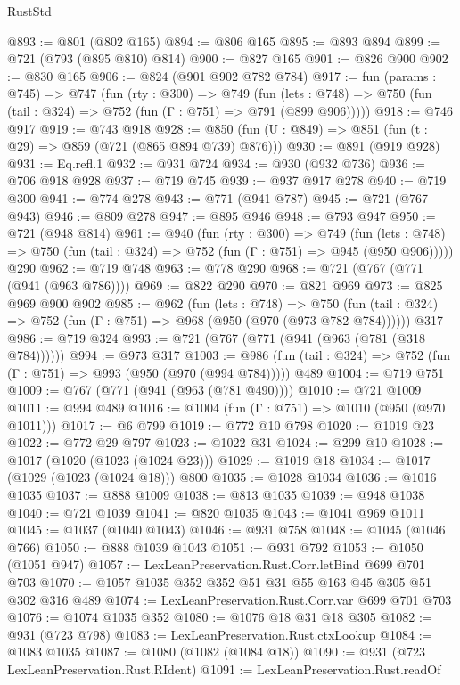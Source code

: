 \begin{lexlean}{RustStd}
\begin{coremodule}
{\begin{coremodule}
{{{{{{{{{{@893 := @801 (@802 @165)
@894 := @806 @165
@895 := @893 @894
@899 := @721 (@793 (@895 @810) @814)
@900 := @827 @165
@901 := @826 @900
@902 := @830 @165
@906 := @824 (@901 @902 @782 @784)
@917 := fun (params : @745) =>
  @747
    (fun (rty : @300) =>
    @749
      (fun (lets : @748) => @750 (fun (tail : @324) => @752 (fun (Γ : @751) => @791 (@899 @906)))))
@918 := @746 @917
@919 := @743 @918
@928 := @850 (fun (U : @849) => @851 (fun (t : @29) => @859 (@721 (@865 @894 @739) @876)))
@930 := @891 (@919 @928)
@931 := Eq.refl.{1}
@932 := @931 @724
@934 := @930 (@932 @736)
@936 := @706 @918 @928
@937 := @719 @745
@939 := @937 @917 @278
@940 := @719 @300
@941 := @774 @278
@943 := @771 (@941 @787)
@945 := @721 (@767 @943)
@946 := @809 @278
@947 := @895 @946
@948 := @793 @947
@950 := @721 (@948 @814)
@961 := @940
    (fun (rty : @300) =>
    @749
      (fun (lets : @748) => @750 (fun (tail : @324) => @752 (fun (Γ : @751) => @945 (@950 @906)))))
    @290
@962 := @719 @748
@963 := @778 @290
@968 := @721 (@767 (@771 (@941 (@963 @786))))
@969 := @822 @290
@970 := @821 @969
@973 := @825 @969 @900 @902
@985 := @962
    (fun (lets : @748) =>
    @750 (fun (tail : @324) => @752 (fun (Γ : @751) => @968 (@950 (@970 (@973 @782 @784))))))
    @317
@986 := @719 @324
@993 := @721 (@767 (@771 (@941 (@963 (@781 (@318 @784))))))
@994 := @973 @317
@1003 := @986 (fun (tail : @324) => @752 (fun (Γ : @751) => @993 (@950 (@970 (@994 @784))))) @489
@1004 := @719 @751
@1009 := @767 (@771 (@941 (@963 (@781 @490))))
@1010 := @721 @1009
@1011 := @994 @489
@1016 := @1004 (fun (Γ : @751) => @1010 (@950 (@970 @1011)))
@1017 := @6 @799
@1019 := @772 @10 @798
@1020 := @1019 @23
@1022 := @772 @29 @797
@1023 := @1022 @31
@1024 := @299 @10
@1028 := @1017 (@1020 (@1023 (@1024 @23)))
@1029 := @1019 @18
@1034 := @1017 (@1029 (@1023 (@1024 @18))) @800
@1035 := @1028 @1034
@1036 := @1016 @1035
@1037 := @888 @1009
@1038 := @813 @1035
@1039 := @948 @1038
@1040 := @721 @1039
@1041 := @820 @1035
@1043 := @1041 @969 @1011
@1045 := @1037 (@1040 @1043)
@1046 := @931 @758
@1048 := @1045 (@1046 @766)
@1050 := @888 @1039 @1043
@1051 := @931 @792
@1053 := @1050 (@1051 @947)
@1057 := LexLeanPreservation.Rust.Corr.letBind @699 @701 @703
@1070 := @1057 @1035 @352 @352 @51 @31 @55 @163 @45 @305 @51 @302 @316 @489
@1074 := LexLeanPreservation.Rust.Corr.var @699 @701 @703
@1076 := @1074 @1035 @352
@1080 := @1076 @18 @31 @18 @305
@1082 := @931 (@723 @798)
@1083 := LexLeanPreservation.Rust.ctxLookup
@1084 := @1083 @1035
@1087 := @1080 (@1082 (@1084 @18))
@1090 := @931 (@723 LexLeanPreservation.Rust.RIdent)
@1091 := LexLeanPreservation.Rust.readOf
}}}}}}}}}}
\end{coremodule}}
\end{coremodule}
\end{lexlean}
